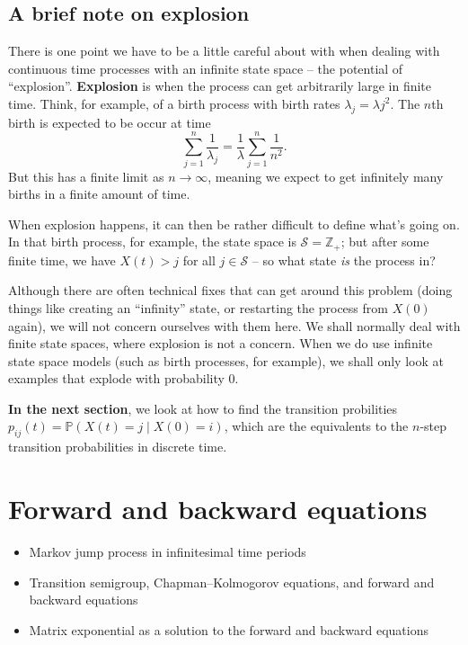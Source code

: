 \documentclass[
  a4paper,
]{article}
\providecommand{\tightlist}{%
  \setlength{\itemsep}{0pt}\setlength{\parskip}{0pt}}
\theoremstyle{definition}
\theoremstyle{definition}
\theoremstyle{definition}
\theoremstyle{remark}
\begin{document}
\hypertarget{explosion}{%
\subsection{A brief note on explosion}\label{explosion}}

There is one point we have to be a little careful about with when dealing with continuous time processes with an infinite state space -- the potential of ``explosion''. \textbf{Explosion} is when the process can get arbitrarily large in finite time. Think, for example, of a birth process with birth rates \(\lambda_j = \lambda j^2\). The \(n\)th birth is expected to be occur at time
\[ \sum_{j=1}^n \frac{1}{\lambda_j} = \frac{1}{\lambda} \sum_{j=1}^n \frac{1}{n^2} . \]
But this has a finite limit as \(n \to \infty\), meaning we expect to get infinitely many births in a finite amount of time.

When explosion happens, it can then be rather difficult to define what's going on. In that birth process, for example, the state space is \(\mathcal S = \mathbb Z_+\); but after some finite time, we have \(X(t) > j\) for all \(j \in \mathcal S\) -- so what state \emph{is} the process in?

Although there are often technical fixes that can get around this problem (doing things like creating an ``infinity'' state, or restarting the process from \(X(0)\) again), we will not concern ourselves with them here. We shall normally deal with finite state spaces, where explosion is not a concern. When we do use infinite state space models (such as birth processes, for example), we shall only look at examples that explode with probability 0.

\textbf{In the next section}, we look at how to find the transition probilities \(p_{ij}(t) = \mathbb P(X(t) = j \mid X(0) = i)\), which are the equivalents to the \(n\)-step transition probabilities in discrete time.

\hypertarget{S18-forward-backward}{%
\section{Forward and backward equations}\label{S18-forward-backward}}

\begin{itemize}
\tightlist
\item
  Markov jump process in infinitesimal time periods
\item
  Transition semigroup, Chapman--Kolmogorov equations, and forward and backward equations
\item
  Matrix exponential as a solution to the forward and backward equations
\end{itemize}
\end{document}
